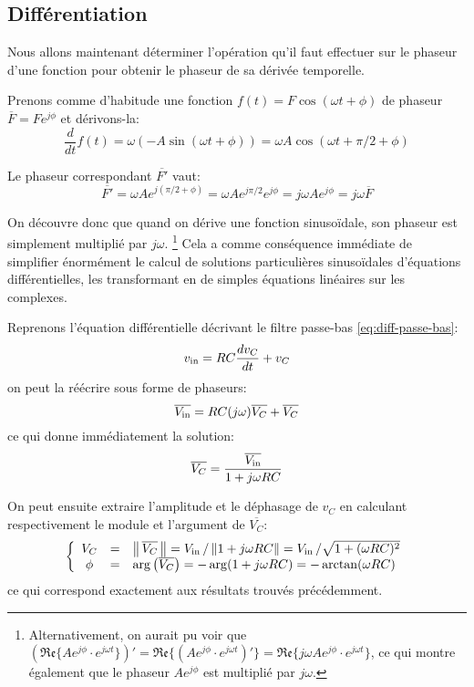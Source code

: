 \subsection{Différentiation}

Nous allons maintenant déterminer l'opération qu'il faut effectuer
sur le phaseur d'une fonction pour obtenir le phaseur de sa dérivée temporelle.

Prenons comme d'habitude une fonction $f(t) = F\cos(\omega t + \phi)$
de phaseur $\overline{F} = Fe^{j\phi}$
et dérivons-la:
\begin{equation}
    \frac{d}{dt}f(t) = \omega (-A\sin(\omega t + \phi))
    = \omega A \cos(\omega t + \pi/2 + \phi)
\end{equation}

Le phaseur correspondant $\overline{F'}$ vaut:
\begin{equation}
    \overline{F'} = \omega A e^{j(\pi/2 + \phi)} = \omega A e^{j\pi/2} e^{j\phi}
    = j\omega A e^{j\phi} = j\omega \overline{F}
\end{equation}

On découvre donc que quand on dérive une fonction sinusoïdale,
son phaseur est simplement multiplié par $j\omega$.
\footnote{
    Alternativement, on aurait pu voir que
    $(\mathfrak{Re}\{ Ae^{j\phi} \cdot e^{j\omega t}  \})'
    = \mathfrak{Re}\{(Ae^{j\phi} \cdot e^{j\omega t})'\}
    = \mathfrak{Re}\{j\omega A e^{j\phi} \cdot e^{j\omega t}\}$,
    ce qui montre également que le phaseur $Ae^{j\phi}$
    est multiplié par $j\omega$.
}
Cela a comme conséquence immédiate de simplifier énormément
le calcul de solutions particulières sinusoïdales d'équations différentielles,
les transformant en de simples équations linéaires sur les complexes.

Reprenons l'équation différentielle décrivant le filtre passe-bas
\eqref{eq:diff-passe-bas}:
\[
    v_{\mathrm{\tiny in}} = RC\frac{dv_C}{dt} + v_C
\]
on peut la réécrire sous forme de phaseurs:
\begin{equation}
    \overline{V_{\mathrm{\tiny in}}} = RC(j\omega)\overline{V_C} + \overline{V_C}
\end{equation}
ce qui donne immédiatement la solution:
\begin{equation}
    \overline{V_C} = \frac{\overline{V_{\mathrm{\tiny in}}}}{1 + j\omega RC}
\end{equation}

On peut ensuite extraire l'amplitude et le déphasage de $v_C$
en calculant respectivement le module et l'argument de $\overline{V_C}$:
\begin{equation}
    \left\{
        \begin{array}{ccl}
            V_C &=& \left\|\,\overline{V_C}\,\right\|
            = V_{\mathrm{\tiny in}}\,/\,\|1+j\omega RC\|
            = V_{\mathrm{\tiny in}}\,/\sqrt{1 + (\omega RC)^2} \\
            \phi &=& \arg\left(\overline{V_C}\right) = -\arg(1+j\omega RC)
            = - \arctan(\omega RC)
        \end{array}
    \right.
\end{equation}
ce qui correspond exactement aux résultats trouvés précédemment.
